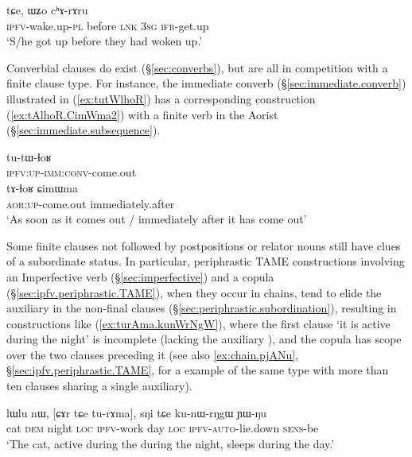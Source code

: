 \begin{exe} 
\ex \label{ex:chWstanW.CWNgW}
 tɕe, ɯʑo cʰɤ-rɤru  \\
\textsc{ipfv}-wake.up-\textsc{pl} before \textsc{lnk} \textsc{3sg} \textsc{ifr}-get.up \\
\glt `S/he got up before they had woken up.' 
\end{exe} 

Converbial clauses do exist (§\ref{sec:converbs}), but are all in competition with a finite clause type. For instance, the immediate converb (§\ref{sec:immediate.converb}) illustrated in (\ref{ex:tutWlhoR}) has a corresponding construction (\ref{ex:tAlhoR.CimWma2}) with a finite verb in the Aorist (§\ref{sec:immediate.subsequence}).

\begin{exe} 
\ex 
\begin{xlist}
\ex \label{ex:tutWlhoR}
\gll tu-tɯ-ɬoʁ \\
\textsc{ipfv}:\textsc{up}-\textsc{imm}:\textsc{conv}-come.out \\
\ex \label{ex:tAlhoR.CimWma2}
\gll tɤ-ɬoʁ ɕimɯma \\
\textsc{aor}:\textsc{up}-come.out immediately.after  \\
\glt `As soon as it comes out / immediately after it has come out'
\end{xlist}
\end{exe} 

Some finite clauses not followed by postpositions or relator nouns still have clues of a subordinate status. In particular, periphrastic TAME constructions involving an Imperfective verb (§\ref{sec:imperfective}) and a copula (§\ref{sec:ipfv.periphrastic.TAME}), when they occur in chains, tend to elide the auxiliary in the non-final clauses (§\ref{sec:periphrastic.subordination}), resulting in constructions like  (\ref{ex:turAma.kunWrNgW}), where the first clause  `it is active during the night' is incomplete (lacking the auxiliary ), and the copula  has scope over the two clauses preceding it (see also \ref{ex:chain.pjANu}, §\ref{sec:ipfv.periphrastic.TAME}, for a example of the same type with more than ten clauses sharing a single auxiliary).

\begin{exe} 
\ex \label{ex:turAma.kunWrNgW}
\gll lɯlu nɯ, [ɕɤr tɕe tu-rɤma], sŋi tɕe ku-nɯ-rŋgɯ ɲɯ-ŋu \\
cat \textsc{dem} night \textsc{loc} \textsc{ipfv}-work day \textsc{loc} \textsc{ipfv}-\textsc{auto}-lie.down \textsc{sens}-be \\
\glt `The cat, active during the during the night, sleeps during the day.' 
\end{exe} 

